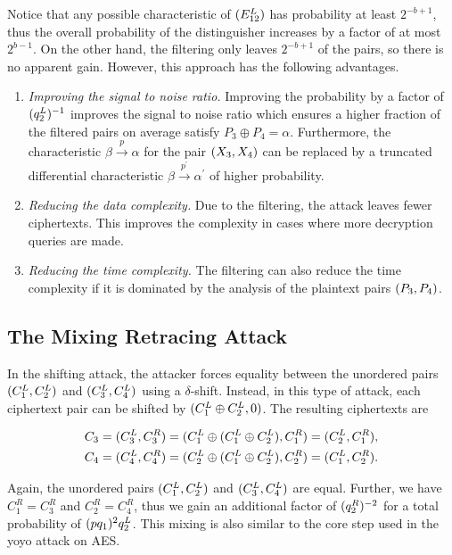 \documentclass[twoside]{article}
\begin{document}
Notice that any possible characteristic of \((E_{12}^L)\) has probability
at least \(2^{-b + 1}\), thus the overall probability of the distinguisher
increases by a factor of at most \(2^{b - 1}\). On the other hand, the filtering
only leaves \(2^{-b + 1}\) of the pairs, so there is no apparent gain. However,
this approach has the following advantages.

\begin{enumerate}
    \item \emph{Improving the signal to noise ratio.} Improving the probability
    by a factor of \((q_2^L)^{-1}\) improves the signal to noise ratio
    which ensures a higher fraction of the filtered pairs on average satisfy
    \(P_3 \oplus P_4 = \alpha\). Furthermore, the characteristic \(\beta
    \xrightarrow{p} \alpha\) for the pair \((X_3, X_4)\) can be replaced by
    a truncated differential characteristic \(\beta \xrightarrow{p^\prime}
    \alpha^\prime\) of higher probability.
    \item \emph{Reducing the data complexity.} Due to the filtering, the attack
    leaves fewer ciphertexts. This improves the complexity in cases where more
    decryption queries are made.
    \item \emph{Reducing the time complexity.} The filtering can also reduce the
    time complexity if it is dominated by the analysis of the plaintext pairs
    \((P_3, P_4)\).
\end{enumerate}

\subsection{The Mixing Retracing Attack}

In the shifting attack, the attacker forces equality between the unordered pairs
\((C_1^L, C_2^L)\) and \((C_3^L, C_4^L)\) using a \(\delta\)-shift.
Instead, in this type of attack, each ciphertext pair can be shifted by
\((C_1^L \oplus C_2^L, 0)\). The resulting ciphertexts are

\begin{align}
    C_3 &= (C_3^L, C_3^R) = (C_1^L \oplus (C_1^L \oplus C_2^L), C_1^R) = (C_2^L, C_1^R), \\
    C_4 &= (C_4^L, C_4^R) = (C_2^L \oplus (C_1^L \oplus C_2^L), C_2^R) = (C_1^L, C_2^R).
\end{align}

Again, the unordered pairs \((C_1^L, C_2^L)\) and \((C_3^L, C_4^L)\)
are equal. Further, we have \(C_1^R = C_3^R\) and \(C_2^R = C_4^R\), thus we
gain an additional factor of \((q_2^R)^{-2}\) for a total probability of
\((pq_1)^2q_2^L\). This mixing is also similar to the core step used in the
yoyo attack on AES.
\end{document}
